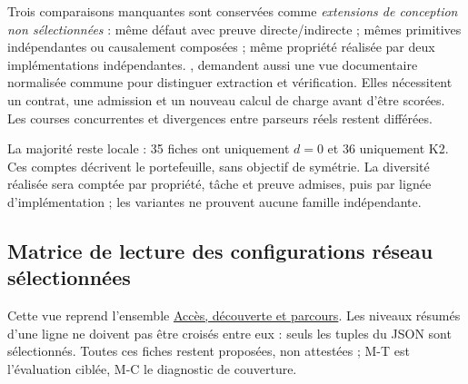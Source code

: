 \documentclass[11pt,a4paper]{article}
\newcommand{\code}[1]{{\small\ttfamily\path{#1}}}
\newcommand{\scenariolink}[1]{\hyperref[scenario:#1]{\code{#1}}}
\newcommand{\comparisonlink}[2]{\hyperlink{comparison:#1}{#2}}
\begin{document}
Trois comparaisons manquantes sont conservées comme \emph{extensions de conception non sélectionnées} : même défaut avec preuve directe/indirecte ; mêmes primitives indépendantes ou causalement composées ; même propriété réalisée par deux implémentations indépendantes. \scenariolink{s_edge_contrat}, \scenariolink{s_ota_contrat} demandent aussi une vue documentaire normalisée commune pour distinguer extraction et vérification. Elles nécessitent un contrat, une admission et un nouveau calcul de charge avant d'être scorées. Les courses concurrentes et divergences entre parseurs réels restent différées.

La majorité reste locale : 35 fiches ont uniquement $d=0$ et 36 uniquement K2. Ces comptes décrivent le portefeuille, sans objectif de symétrie. La diversité réalisée sera comptée par propriété, tâche et preuve admises, puis par lignée d'implémentation ; les variantes ne prouvent aucune famille indépendante.


\subsection{Matrice de lecture des configurations réseau sélectionnées}\label{sec:network-matrix}\hypertarget{sec:network-matrix}{}
Cette vue reprend l’ensemble \comparisonlink{E14}{Accès, découverte et parcours}. Les niveaux résumés d’une ligne ne doivent pas être croisés entre eux : seuls les tuples du JSON sont sélectionnés. Toutes ces fiches restent proposées, non attestées ; M-T est l’évaluation ciblée, M-C le diagnostic de couverture.
\end{document}
